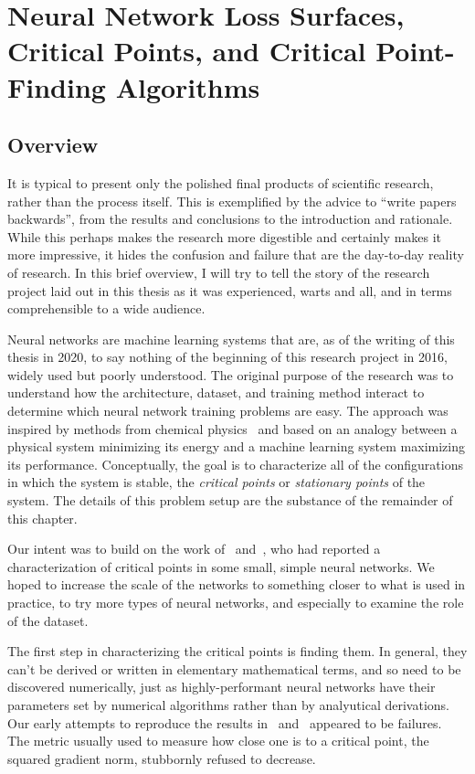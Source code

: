 \documentclass[../../thesis.tex]{subfiles}
\begin{document}
\chapter{Neural Network Loss Surfaces, Critical Points, and Critical Point-Finding Algorithms}

\section{Overview}

It is typical to present only the polished final
products of scientific research,
rather than the process itself.
This is exemplified by the advice to
\enquote{write papers backwards},
from the results and conclusions to the introduction and rationale.
While this perhaps makes the research more digestible and
certainly makes it more impressive,
it hides the confusion and failure
that are the day-to-day reality of research.
In this brief overview,
I will try to tell the story of the research project
laid out in this thesis as it was experienced,
warts and all,
and in terms comprehensible to a wide audience.

Neural networks are machine learning systems
that are, as of the writing of this thesis in 2020,
to say nothing of the beginning of this research project in 2016,
widely used but poorly understood.
The original purpose of the research was to
understand how the
architecture, dataset, and training method
interact to determine which neural network training problems
are easy.
The approach was inspired by methods from chemical physics~\cite{ballard2017}
and based on an analogy between a physical system minimizing its energy
and a machine learning system maximizing its performance.
Conceptually, the goal is to characterize all of the configurations
in which the system is stable,
the \emph{critical points} or \emph{stationary points}
of the system.
The details of this problem setup are the substance
of the remainder of this chapter.

Our intent was to build on the work
of~\cite{dauphin2014} and~\cite{pennington2017},
who had reported a characterization of critical points in
some small, simple neural networks.
We hoped to increase the scale of the networks to something
closer to what is used in practice,
to try more types of neural networks,
and especially to examine the role of the dataset.

The first step in characterizing the critical points is finding them.
In general, they can't be derived or written in elementary mathematical terms,
and so need to be discovered numerically,
just as highly-performant neural networks have their parameters set
by numerical algorithms rather than by analyutical derivations.
Our early attempts to reproduce the results
in~\cite{dauphin2014} and~\cite{pennington2017}
appeared to be failures.
The metric usually used to measure how close one is
to a critical point, the squared gradient norm,
stubbornly refused to decrease.
\end{document}
